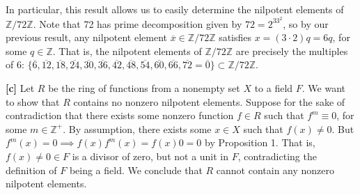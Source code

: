 In particular, this result allows us to easily determine the nilpotent elements of $\mathbb{Z}/72\mathbb{Z}$. Note that 72 has prime decomposition given by $72 = 2^33^2$, so by our previous result, any nilpotent element $\overline{x} \in \mathbb{Z}/72\mathbb{Z}$ satisfies $x = (3\cdot2)q = 6q$, for some $q \in \mathbb{Z}$. That is, the nilpotent elements of $\mathbb{Z}/72\mathbb{Z}$ are precisely the multiples of 6: $\{\overline{6}, \overline{12}, \overline{18}, \overline{24}, \overline{30}, \overline{36}, \overline{42}, \overline{48}, \overline{54}, \overline{60}, \overline{66}, \overline{72} = \overline{0}\} \subset \mathbb{Z}/72\mathbb{Z}$.

\vspace{3 mm} 

\textbf{[c]} Let $R$ be the ring of functions from a nonempty set $X$ to a field $F$. We want to show that $R$ contains no nonzero nilpotent elements. Suppose for the sake of contradiction that there exists some nonzero function $f \in R$ such that $f^m \equiv 0$, for some $m \in \mathbb{Z}^+$. By assumption, there exists some $x \in X$ such that $f(x) \not= 0$. But $f^m(x) = 0 \implies f(x)f^m(x) = f(x)0 = 0$ by Proposition 1. That is, $f(x) \not= 0 \in F$ is a divisor of zero, but not a unit in $F$, contradicting the definition of $F$ being a field. We conclude that $R$ cannot contain any nonzero nilpotent elements.